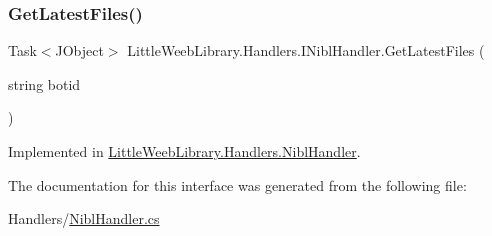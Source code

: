 \mbox{\label{interface_little_weeb_library_1_1_handlers_1_1_i_nibl_handler_a744548c45993c925a492744f1fb747e9}} 
\subsubsection{\texorpdfstring{Get\+Latest\+Files()}{GetLatestFiles()}}
{\footnotesize\ttfamily Task$<$J\+Object$>$ Little\+Weeb\+Library.\+Handlers.\+I\+Nibl\+Handler.\+Get\+Latest\+Files (\begin{DoxyParamCaption}\item[{string}]{botid }\end{DoxyParamCaption})}



Implemented in \mbox{\hyperlink{class_little_weeb_library_1_1_handlers_1_1_nibl_handler_a20fef31afe52976e394fc44659cc3593}{Little\+Weeb\+Library.\+Handlers.\+Nibl\+Handler}}.



The documentation for this interface was generated from the following file\+:\begin{DoxyCompactItemize}
\item 
Handlers/\mbox{\hyperlink{_nibl_handler_8cs}{Nibl\+Handler.\+cs}}\end{DoxyCompactItemize}
